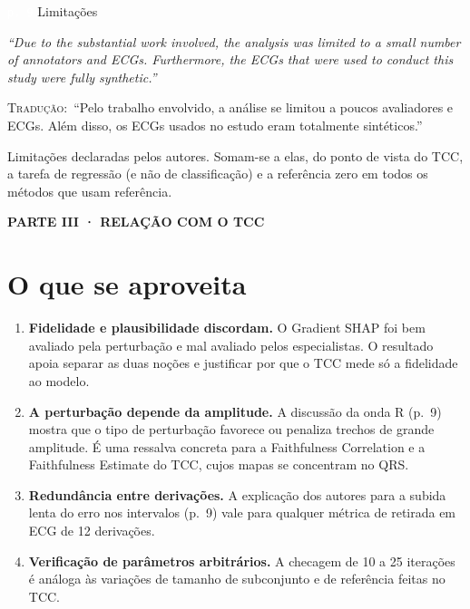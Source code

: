\documentclass[11pt,a4paper]{article}
\newcommand{\pagechip}[1]{{\setlength{\fboxsep}{1.5pt}\colorbox{cAcc}{\textcolor{white}{\scriptsize\texttt{#1}}}}}
\newcommand{\partbar}[1]{\par\vspace{1.2em}\noindent\colorbox{black!80}{\parbox{\dimexpr\linewidth-2\fboxsep}{\color{white}\bfseries\sffamily\MakeUppercase{#1}}}\par\vspace{0.4em}}
\newenvironment{origquote}{\par\itshape\small}{\par}
\newenvironment{tradquote}{\par\small\textsc{Tradução:}\ }{\par}
\newcommand{\explab}[1]{\par\smallskip{\small\color{cAcc}\textbf{\MakeUppercase{#1}}}\par}
\begin{document}
\begin{citacard}{\pagechip{p. 9} Limitações}
\begin{origquote}“Due to the substantial work involved, the analysis was limited to a small number of annotators and ECGs. Furthermore, the ECGs that were used to conduct this study were fully synthetic.”\end{origquote}
\begin{tradquote}“Pelo trabalho envolvido, a análise se limitou a poucos avaliadores e ECGs. Além disso, os ECGs usados no estudo eram totalmente sintéticos.”\end{tradquote}
\explab{Explicação}
Limitações declaradas pelos autores. Somam-se a elas, do ponto de vista do TCC, a tarefa de regressão (e não de classificação) e a referência zero em todos os métodos que usam referência.
\end{citacard}

\partbar{Parte III · Relação com o TCC}

\section{O que se aproveita}
\begin{enumerate}
\item \textbf{Fidelidade e plausibilidade discordam.} O Gradient SHAP foi bem avaliado pela perturbação e mal avaliado pelos especialistas. O resultado apoia separar as duas noções e justificar por que o TCC mede só a fidelidade ao modelo.
\item \textbf{A perturbação depende da amplitude.} A discussão da onda R (p.~9) mostra que o tipo de perturbação favorece ou penaliza trechos de grande amplitude. É uma ressalva concreta para a Faithfulness Correlation e a Faithfulness Estimate do TCC, cujos mapas se concentram no QRS.
\item \textbf{Redundância entre derivações.} A explicação dos autores para a subida lenta do erro nos intervalos (p.~9) vale para qualquer métrica de retirada em ECG de 12 derivações.
\item \textbf{Verificação de parâmetros arbitrários.} A checagem de 10 a 25 iterações é análoga às variações de tamanho de subconjunto e de referência feitas no TCC.
\end{enumerate}
\end{document}
